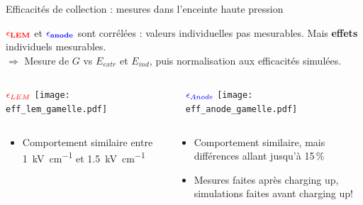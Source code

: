     \begin{frame}{Efficacités de collection : mesures dans l'enceinte haute pression}
        \begin{scriptsize}
            $\mathbf{ \textcolor{red}{\epsilon_{LEM}}}$ et $\mathbf{ \textcolor{blue}{\epsilon_{anode}}}$ sont corrélées : valeurs individuelles pas mesurables. Mais \textbf{effets} individuels mesurables.\\
            $\Rightarrow$ Mesure de $G$ vs $E_{extr}$ et $E_{ind}$, puis normalisation aux efficacités simulées.
        \begin{columns}
            \begin{column}{0.5\textwidth}
                \centering $\textcolor{red}{\epsilon_{LEM}}$
                \texttt{[image: eff\_lem\_gamelle.pdf]}
            \end{column}\hfill
            \begin{column}{0.5\textwidth}
                \centering $\textcolor{blue}{\epsilon_{Anode}}$
                \texttt{[image: eff\_anode\_gamelle.pdf]}
            \end{column}
        \end{columns}
   		\begin{columns}
            \begin{column}{0.5\textwidth}
                \begin{itemize}
                    \item Comportement similaire entre \SI{1}{\kilo\volt\per\centi\meter} et \SI{1.5}{\kilo\volt\per\centi\meter}
                \end{itemize}
            \end{column}\hfill
            \begin{column}{0.5\textwidth}
                \begin{itemize}
                    \item Comportement similaire, mais différences allant jusqu'à 15\,\%
                    \item[\danger] Mesures faites après charging up, simulations faites avant charging up!
                \end{itemize}
            \end{column}
        \end{columns}
        \end{scriptsize}
    \end{frame}

